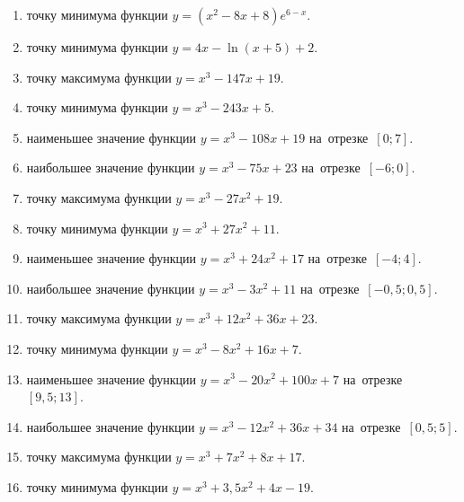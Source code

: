 \documentclass[a4paper,10pt]{article}
\begin{document}
\begin{enumerate}
\item {} точку минимума функции $y=\left(x^2-8x+8\right){{e}^{6-x}}$.

\item {} точку минимума функции $y=4x-\ln \left(x+5\right)+2$.

\item {} точку максимума функции $y=x^3 -147x +19$.

\item {} точку минимума функции $y=x^3 -243x+5$.

\item {} наименьшее значение функции $y=x^3 -108x+19$ на~отрезке~$\left[0;7\right]$.

\item {} наибольшее значение функции $y=x^3 -75x+23$ на~отрезке~$\left[-6;0\right]$.

\item {} точку максимума функции $y=x^3 -27x^2+19$.

\item {} точку минимума функции $y=x^3 +27x^2+11$.

\item {} наименьшее значение функции $y=x^3 +24x^2+17$ на~отрезке~$\left[-4;4\right]$.

\item {} наибольшее значение функции $y=x^3 -3x^2+11$ на~отрезке~$\left[-0,5;0,5\right]$.

\item {} точку максимума функции $y=x^3 +12x^2+36x+23$.

\item {} точку минимума функции $y=x^3 -8x^2+16x+7$.

\item {} наименьшее значение функции $y=x^3 -20x^2+100x+7$ на~отрезке~$\left[9,5;13\right]$.

\item {} наибольшее значение функции $y=x^3 -12x^2+36x+34$ на~отрезке~$\left[0,5;5\right]$.

\item {} точку максимума функции $y=x^3 +7x^2+8x+17$.

\item {} точку минимума функции $y=x^3 +3,5x^2+4x-19$.


\end{enumerate}
\end{document}
